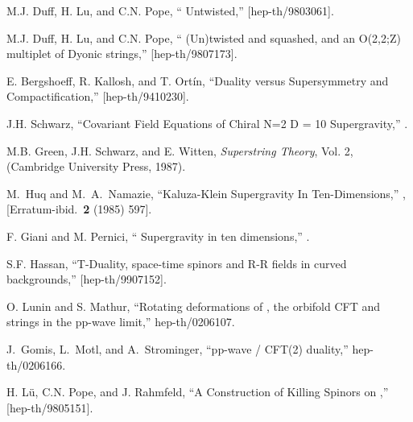 \documentclass[a4paper,12pt]{article}
\begin{document}
\begin{thebibliography}{99}
 M.J. Duff, H. Lu, and C.N. Pope, ``\coordHE{} Untwisted,''  [hep-th/9803061].

  M.J. Duff, H. Lu, and C.N. Pope, ``\coordHE{} (Un)twisted and squashed, and an O(2,2;Z) multiplet of Dyonic strings,''  [hep-th/9807173].

 E. Bergshoeff, R. Kallosh, and T. Ort\'{i}n, ``Duality versus Supersymmetry and Compactification,''  [hep-th/9410230].


 J.H. Schwarz, ``Covariant Field Equations of Chiral N=2 D = 10 Supergravity,'' .

 M.B. Green, J.H. Schwarz, and E. Witten, {\it Superstring Theory}, Vol. 2, (Cambridge University Press, 1987).


M.~Huq and M.~A.~Namazie,
``Kaluza-Klein Supergravity In Ten-Dimensions,'' ,
[Erratum-ibid.\  {\bf 2} (1985) 597].

 F. Giani and M. Pernici, ``\coordHE{} Supergravity in ten dimensions,'' .

 S.F. Hassan, ``T-Duality, space-time spinors and R-R fields in curved backgrounds,''  [hep-th/9907152].

 O. Lunin and S. Mathur, ``Rotating deformations of \coordHE{}, the orbifold CFT and strings in the pp-wave limit,'' hep-th/0206107.

 J.~Gomis, L.~Motl, and A.~Strominger, ``pp-wave / CFT(2) duality,'' hep-th/0206166.

 H. L\"{u}, C.N. Pope, and J. Rahmfeld, ``A Construction of Killing Spinors on \coordHE{},''  [hep-th/9805151].


\end{thebibliography}
\end{document}
